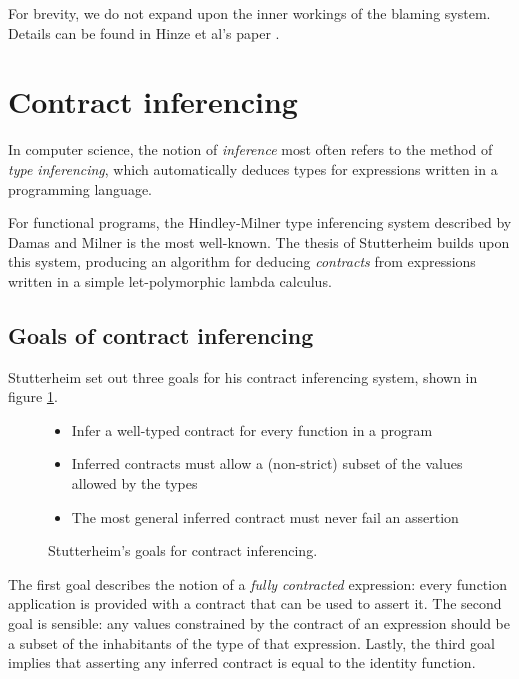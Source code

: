 \documentclass[10pt]{report}
\begin{document}
For brevity, we do not expand upon the inner workings of the blaming system.
Details can be found in Hinze et al's paper \cite{Hinze06typedcontracts}.

\section{Contract inferencing}
\label{background-inferencing}

In computer science, the notion of \textit{inference} most often refers to the method of \textit{type inferencing}, which automatically deduces types for expressions written in a programming language.

For functional programs, the Hindley-Milner type inferencing system described by Damas and Milner \cite{Damas:1982ve} is the most well-known.
The thesis of Stutterheim \cite{Stutterheim:2013:thesis} builds upon this system, producing an algorithm for deducing \textit{contracts} from expressions written in a simple let-polymorphic lambda calculus.

\subsection{Goals of contract inferencing}
Stutterheim set out three goals for his contract inferencing system, shown in figure \ref{fig:goals-stutterheim-contract-inferencing}.

\begin{figure}[htps]
\begin{framed}
\begin{center}
\begin{itemize}
	\item Infer a well-typed contract for every function in a program
	\item Inferred contracts must allow a (non-strict) subset of the values allowed
by the types
	\item The most general inferred contract must never fail an assertion
\end{itemize}
\end{center}
\end{framed}
\caption{\label{fig:goals-stutterheim-contract-inferencing}Stutterheim's goals for contract inferencing.}
\end{figure}

The first goal describes the notion of a \textit{fully contracted} expression: every function application is provided with a contract that can be used to assert it.
The second goal is sensible: any values constrained by the contract of an expression should be a subset of the inhabitants of the type of that expression.
Lastly, the third goal implies that asserting any inferred contract is equal to the identity function.
\end{document}
